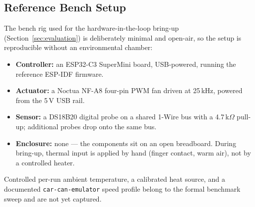 \subsection{Reference Bench Setup}

The bench rig used for the hardware-in-the-loop bring-up (Section~\ref{sec:evaluation}) is deliberately minimal and open-air, so the setup is reproducible without an environmental chamber:

\begin{itemize}[leftmargin=*]
    \item \textbf{Controller:} an ESP32-C3 SuperMini board, USB-powered, running the reference ESP-IDF firmware.
    \item \textbf{Actuator:} a Noctua NF-A8 four-pin PWM fan driven at 25\,kHz, powered from the 5\,V USB rail.
    \item \textbf{Sensor:} a DS18B20 digital probe on a shared 1-Wire bus with a 4.7\,k$\Omega$ pull-up; additional probes drop onto the same bus.
    \item \textbf{Enclosure:} none --- the components sit on an open breadboard. During bring-up, thermal input is applied by hand (finger contact, warm air), not by a controlled heater.
\end{itemize}

Controlled per-run ambient temperature, a calibrated heat source, and a documented \texttt{car-can-emulator} speed profile belong to the formal benchmark sweep and are not yet captured.

\endinput

